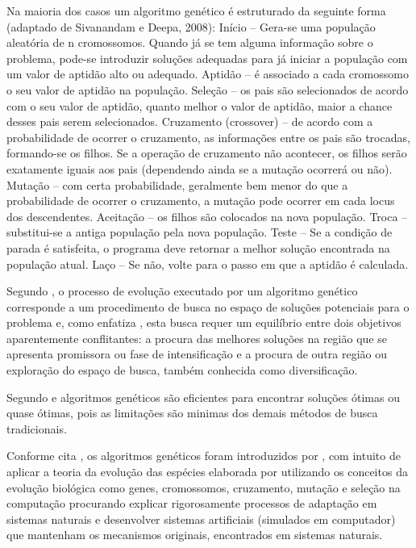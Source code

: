 \documentclass{abntpuc}
\begin{document}
Na maioria dos casos um algoritmo genético é estruturado da seguinte forma 
(adaptado de Sivanandam e Deepa, 2008): 
Início – Gera-se uma população aleatória de n cromossomos. Quando já se tem 
alguma informação sobre o problema, pode-se introduzir soluções adequadas para já iniciar a 
população com um valor de aptidão alto ou adequado. 
Aptidão – é associado a cada cromossomo o seu valor de aptidão na população. 
Seleção – os pais são selecionados de acordo com o seu valor de aptidão, quanto 
melhor o valor de aptidão, maior a chance desses pais serem selecionados. 
Cruzamento (crossover) – de acordo com a probabilidade de ocorrer o cruzamento, 
as informações entre os pais são trocadas, formando-se os filhos. Se a operação de 
cruzamento não acontecer, os filhos serão exatamente iguais aos pais (dependendo ainda se a 
mutação ocorrerá ou não). 
Mutação – com certa probabilidade, geralmente bem menor do que a probabilidade de 
ocorrer o cruzamento, a mutação pode ocorrer em cada locus dos descendentes. 
Aceitação – os filhos são colocados na nova população. 
Troca – substitui-se a antiga população pela nova população. 
Teste – Se a condição de parada é satisfeita, o programa deve retornar a melhor 
solução encontrada na população atual. 
Laço – Se não, volte para o passo em que a aptidão é calculada. 


Segundo \cite{oliveira2005algoritmo}, o processo de evolução executado por um algoritmo genético corresponde a um procedimento de busca no espaço de soluções potenciais para o problema e, como enfatiza \cite{michalewicz1996evolutionary}, esta busca requer um equilíbrio entre dois objetivos aparentemente conflitantes: a procura das melhores soluções na região que se apresenta promissora ou fase de intensificação e a procura de outra região ou exploração do espaço de busca, também conhecida como diversificação.\par


Segundo \cite{hamawaki2011geraccao} e \cite{oliveira2005algoritmo} algoritmos genéticos são eficientes para encontrar soluções ótimas ou quase ótimas, pois as limitações são minimas dos demais métodos de busca tradicionais.


Conforme cita \cite{oliveira2005algoritmo}, os algoritmos genéticos foram introduzidos por \cite{holland1975adaptation}, com intuito de aplicar a teoria da evolução das espécies elaborada por \cite{darwin1968origin} utilizando os conceitos da evolução biológica como genes, cromossomos, cruzamento, mutação e seleção na computação procurando explicar rigorosamente processos de adaptação em sistemas naturais e desenvolver sistemas artificiais (simulados em computador) que mantenham os mecanismos originais, encontrados em sistemas naturais.\par
\end{document}
